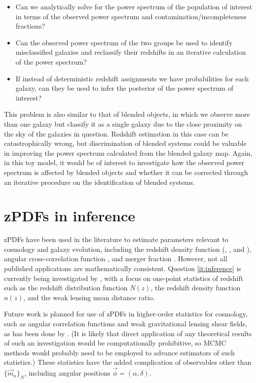 \documentclass[12pt, onecolumn]{emulateapj}
\begin{document}
\begin{itemize}
\item Can we analytically solve for the power spectrum of the population of interest in terms of the observed power spectrum and contamination/incompleteness fractions?
\item Can the observed power spectrum of the two groups be used to identify misclassified galaxies and reclassify their redshifts in an iterative calculation of the power spectrum?
\item If instead of deterministic redshift assignments we have probabilities for each galaxy, can they be used to infer the posterior of the power spectrum of interest?
\end{itemize}

This problem is also similar to that of blended objects, in which we observe more than one galaxy but classify it as a single galaxy due to the close proximity on the sky of the galaxies in question.  Redshift estimation in this case can be catastrophically wrong, but discrimination of blended systems could be valuable in improving the power spectrum calculated from the blended galaxy map.  Again, in this toy model, it would be of interest to investigate how the observed power spectrum is affected by blended objects and whether it can be corrected through an iterative procedure on the identification of blended systems.

\section{zPDFs in inference}

zPDFs have been used in the literature to estimate parameters relevant to cosmology and galaxy evolution, including the redshift density function (\citet{she11}, \citet{bon13}, and \citet{vii15}), angular cross-correlation function \citep{mye09}, and merger fraction \citep{lop14}.  However, not all published applications are mathematically consistent.   Question \ref{it:inference} is currently being investigated by \citet{mal15}, with a focus on one-point statistics of redshift such as the redshift distribution function $N(z)$, the redshift density function $n(z)$, and the weak lensing mean distance ratio.

Future work is planned for use of zPDFs in higher-order statistics for cosmology, such as angular correlation functions and weak gravitational lensing shear fields, as has been done by \citet{man07}.  (It is likely that direct application of any theoretical results of such an investigation would be computationally prohibitive, so MCMC methods would probably need to be employed to advance estimators of such statistics.)  These statistics have the added complication of observables other than $\{\vec{m}_{n}\}_{N}$, including angular positions $\vec{\phi}=(\alpha,\delta)$.  
\end{document}
